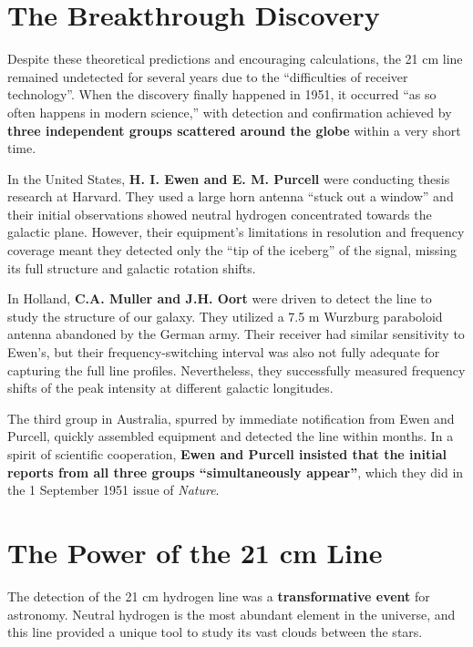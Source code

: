 \documentclass{../template/texnote}
\begin{document}
\section{The Breakthrough Discovery}

Despite these theoretical predictions and encouraging calculations, the 21 cm line remained undetected for several years due to the ``difficulties of receiver technology''.
When the discovery finally happened in 1951, it occurred ``as so often happens in modern science,'' with detection and confirmation achieved by \textbf{three independent groups scattered around the globe} within a very short time.

In the United States, \textbf{H. I. Ewen and E. M. Purcell} were conducting thesis research at Harvard.
They used a large horn antenna ``stuck out a window'' and their initial observations showed neutral hydrogen concentrated towards the galactic plane.
However, their equipment's limitations in resolution and frequency coverage meant they detected only the ``tip of the iceberg'' of the signal, missing its full structure and galactic rotation shifts.

In Holland, \textbf{C.A. Muller and J.H. Oort} were driven to detect the line to study the structure of our galaxy.
They utilized a 7.5 m Wurzburg paraboloid antenna abandoned by the German army.
Their receiver had similar sensitivity to Ewen's, but their frequency-switching interval was also not fully adequate for capturing the full line profiles.
Nevertheless, they successfully measured frequency shifts of the peak intensity at different galactic longitudes.

The third group in Australia, spurred by immediate notification from Ewen and Purcell, quickly assembled equipment and detected the line within months.
In a spirit of scientific cooperation, \textbf{Ewen and Purcell insisted that the initial reports from all three groups ``simultaneously appear''}, which they did in the 1 September 1951 issue of \textit{Nature}.

\section{The Power of the 21 cm Line}

The detection of the 21 cm hydrogen line was a \textbf{transformative event} for astronomy.
Neutral hydrogen is the most abundant element in the universe, and this line provided a unique tool to study its vast clouds between the stars.
\end{document}
